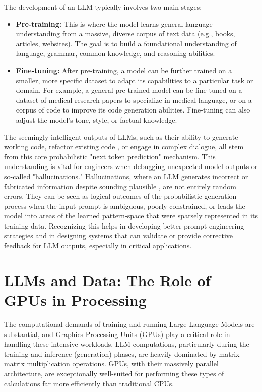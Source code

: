 The development of an LLM typically involves two main stages:

\begin{itemize}
    \item \textbf{Pre-training:} This is where the model learns general language understanding from a massive, diverse corpus of text data 
    (e.g., books, articles, websites). The goal is to build a foundational understanding of language, grammar, common knowledge, and reasoning abilities.
    \item \textbf{Fine-tuning:} After pre-training, a model can be further trained on a smaller, more specific dataset to adapt its capabilities 
    to a particular task or domain. For example, a general pre-trained model can be fine-tuned on a dataset of medical research papers to specialize 
    in medical language, or on a corpus of code to improve its code generation abilities. Fine-tuning can also adjust the model's tone, style, or factual knowledge.
\end{itemize}

The seemingly intelligent outputs of LLMs, such as their ability to generate working code, refactor existing code , or engage in complex dialogue, 
all stem from this core probabilistic "next token prediction" mechanism. This understanding is vital for engineers when debugging unexpected model 
outputs or so-called "hallucinations." Hallucinations, where an LLM generates incorrect or fabricated information despite sounding plausible , 
are not entirely random errors. They can be seen as logical outcomes of the probabilistic generation process when the input prompt is ambiguous, 
poorly constrained, or leads the model into areas of the learned pattern-space that were sparsely represented in its training data. 
Recognizing this helps in developing better prompt engineering strategies and in designing systems that can validate or provide corrective 
feedback for LLM outputs, especially in critical applications.

\section{LLMs and Data: The Role of GPUs in Processing}

The computational demands of training and running Large Language Models are substantial, and Graphics Processing Units (GPUs) play a critical 
role in handling these intensive workloads. LLM computations, particularly during the training and inference (generation) phases, are heavily 
dominated by matrix-matrix multiplication operations. GPUs, with their massively parallel architecture, are exceptionally well-suited for 
performing these types of calculations far more efficiently than traditional CPUs.


